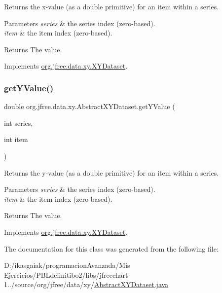 Returns the x-\/value (as a double primitive) for an item within a series.


\begin{DoxyParams}{Parameters}
{\em series} & the series index (zero-\/based). \\
\hline
{\em item} & the item index (zero-\/based).\\
\hline
\end{DoxyParams}
\begin{DoxyReturn}{Returns}
The value. 
\end{DoxyReturn}


Implements \mbox{\hyperlink{interfaceorg_1_1jfree_1_1data_1_1xy_1_1_x_y_dataset_a65bd212539d8f7dfb3d3d36b5f42e083}{org.\+jfree.\+data.\+xy.\+X\+Y\+Dataset}}.

\mbox{\label{classorg_1_1jfree_1_1data_1_1xy_1_1_abstract_x_y_dataset_a2a37653acb0e32c2dbf89fd9ca8695fe}} 
\subsubsection{\texorpdfstring{get\+Y\+Value()}{getYValue()}}
{\footnotesize\ttfamily double org.\+jfree.\+data.\+xy.\+Abstract\+X\+Y\+Dataset.\+get\+Y\+Value (\begin{DoxyParamCaption}\item[{int}]{series,  }\item[{int}]{item }\end{DoxyParamCaption})}

Returns the y-\/value (as a double primitive) for an item within a series.


\begin{DoxyParams}{Parameters}
{\em series} & the series index (zero-\/based). \\
\hline
{\em item} & the item index (zero-\/based).\\
\hline
\end{DoxyParams}
\begin{DoxyReturn}{Returns}
The value. 
\end{DoxyReturn}


Implements \mbox{\hyperlink{interfaceorg_1_1jfree_1_1data_1_1xy_1_1_x_y_dataset_a5e86389417eb5ed7b663a952ca370914}{org.\+jfree.\+data.\+xy.\+X\+Y\+Dataset}}.



The documentation for this class was generated from the following file\+:\begin{DoxyCompactItemize}
\item 
D\+:/ikasgaiak/programacion\+Avanzada/\+Mis Ejercicios/\+P\+B\+Ldefinitibo2/libs/jfreechart-\/1../source/org/jfree/data/xy/\mbox{\hyperlink{_abstract_x_y_dataset_8java}{Abstract\+X\+Y\+Dataset.\+java}}\end{DoxyCompactItemize}
